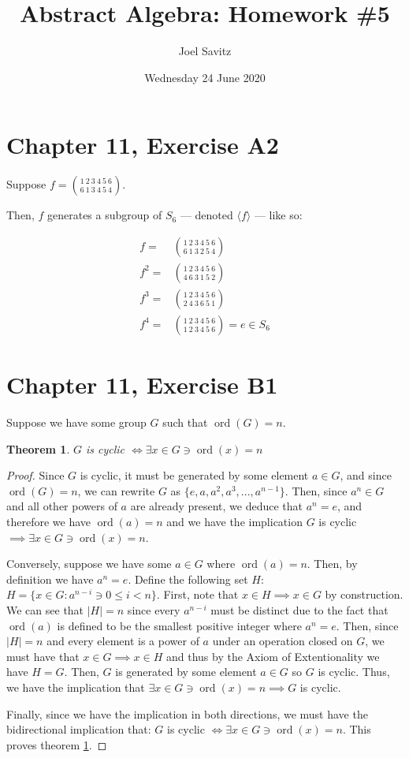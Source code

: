 \documentclass[12pt]{amsart}
\title{Abstract Algebra: Homework \#5}
\author{Joel Savitz}
\date{Wednesday 24 June 2020}
\newcommand{\ord}{\operatorname{ord}}
\newtheorem{thm}{Theorem}
\begin{document}
\maketitle

\section{Chapter 11, Exercise A2}

Suppose $f = \binom{1\ 2\ 3\ 4\ 5\ 6}{6\ 1\ 3\ 4\ 5\ 4}$.

Then, $f$ generates a subgroup of $S_6$
--- denoted $\langle f \rangle$ ---
like so:

\begin{align}
	f = & \binom{1\ 2\ 3\ 4\ 5\ 6}{6\ 1\ 3\ 2\ 5\ 4} \\
	f^2 = & \binom{1\ 2\ 3\ 4\ 5\ 6}{4\ 6\ 3\ 1\ 5\ 2} \\
	f^3 = & \binom{1\ 2\ 3\ 4\ 5\ 6}{2\ 4\ 3\ 6\ 5\ 1} \\
	f^4 = & \binom{1\ 2\ 3\ 4\ 5\ 6}{1\ 2\ 3\ 4\ 5\ 6} = e \in S_6
\end{align}

\section{Chapter 11, Exercise B1}

Suppose we have some group $G$ such that
$\ord(G) = n$.

\begin{thm} \label{thm1}
	$G$ is cyclic $\iff \exists x \in G \ni \ord(x) = n$	
\end{thm}

\begin{proof}
	Since $G$ is cyclic,
	it must be generated
	by some element $a \in G$,
	and since $\ord(G) = n$,
	we can rewrite $G$ as
	$\{e, a, a^2, a^3, ..., a^{n-1} \}$.
	Then, since $a^n \in G$ and all other
	powers of $a$ are already present,
	we deduce that $a^n = e$,
	and therefore we have $\ord(a) = n$
	and we have the implication
	$G$ is cyclic $\implies \exists x \in G \ni \ord(x) = n$.

	Conversely,
	suppose we have some $a \in G$
	where $\ord(a) = n$.
	Then, by definition
	we have $a^n = e$.
	Define the following set $H$:
	$H = \{x \in G: a^{n-i} \ni 0 \le i < n \}$.
	First, note that $x \in H \implies x \in G$ by construction.
	We can see that $|H| = n$
	since every $a^{n-i}$ must be distinct
	due to the fact that $\ord(a)$ is defined
	to be the smallest positive integer
	where $a^n = e$.
	Then, since $|H| = n$ and every element is a power
	of $a$ under an operation closed on $G$,
	we must have that $x \in G \implies x \in H$
	and thus by the Axiom of Extentionality
	we have $H = G$.
	Then, $G$ is generated by some element $a \in G$
	so $G$ is cyclic.
	Thus, we have
	the implication that
	$\exists x \in G \ni \ord(x) = n \implies G$ is cyclic.

	Finally, since we have the implication in both directions,
	we must have the bidirectional implication that:
	$G$ is cyclic $\iff \exists x \in G \ni \ord(x) = n$.
	This proves theorem \ref{thm1}.
\end{proof}
\end{document}
